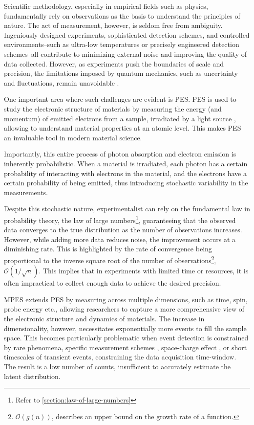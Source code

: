 Scientific methodology, especially in empirical fields such as physics, fundamentally rely on observations as the basis to understand the principles of nature. The act of measurement, however, is seldom free from ambiguity. Ingeniously designed experiments, sophisticated detection schemes, and controlled environments--such as ultra-low temperatures or precisely engineered detection schemes--all contribute to minimizing external noise and improving the quality of data collected. However, as experiments push the boundaries of scale and precision, the limitations imposed by quantum mechanics, such as uncertainty and fluctuations, remain unavoidable \cite{heisenbergPhysicalPrinciplesQuantum2009,sakuraiModernQuantumMechanics2020,binneyPhysicsQuantumMechanics2014}.

One important area where such challenges are evident is \gls{PES}. \Gls{PES} is used to study the electronic structure of materials by measuring the energy (and momentum) of emitted electrons from a sample, irradiated by a light source \cite{cardonaGeneralPrinciples1978}, allowing to understand material properties at an atomic level. This makes \gls{PES} an invaluable tool in modern material science. 

Importantly, this entire process of photon absorption and electron emission is inherently probabilistic. When a material is irradiated, each photon has a certain probability of interacting with electrons in the material, and the electrons have a certain probability of being emitted, thus introducing stochastic variability in the measurements.

Despite this stochastic nature, experimentalist can rely on the fundamental law in probability theory, the law of large numbers\footnote{Refer to \cref{section:law-of-large-numbers}}, guaranteeing that the observed data converges to the true distribution as the number of observations increases. However, while adding more data reduces \gls{noise}, the improvement occurs at a diminishing rate. This is highlighted by the rate of convergence being proportional to the inverse square root of the number of observations\footnote{$\mathcal{O}(g(n))$, describes an upper bound on the growth rate of a function.}, $\mathcal{O}(1/\sqrt{n})$. This implies that in experiments with limited time or resources, it is often impractical to collect enough data to achieve the desired precision.

\Gls{MPES} extends \gls{PES} by measuring across multiple dimensions, such as time, spin, probe energy etc., allowing researchers to capture a more comprehensive view of the electronic structure and dynamics of materials. The increase in dimensionality, however, necessitates exponentially more events to fill the sample space. This becomes particularly problematic when event detection is constrained by rare phenomena, specific measurement schemes \cite{maklarQuantitativeComparisonTimeflight2020}, space-charge effect \cite{schonhenseMultidimensionalPhotoemissionSpectroscopy2018}, or short timescales of transient events, constraining the data acquisition time-window. The result is a low number of counts, insufficient to accurately estimate the \gls{latent} distribution. 

